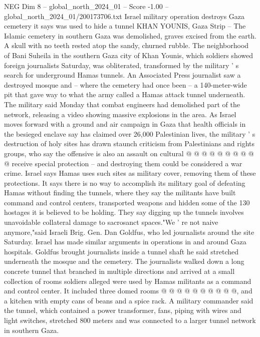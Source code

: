 \begin{textsample}{NEG Dim 8 – global\_north\_2024\_01 – Score -1.00 – global\_north\_2024\_01/200173706.txt}  \label{ex:f8_neg_210}
Israel military operation destroys Gaza cemetery it says was used to hide a tunnel KHAN YOUNIS, Gaza Strip -- The Islamic cemetery in southern Gaza was demolished, graves excised from the earth.
A skull with no teeth rested atop the sandy, churned rubble.
The neighborhood of Bani Suheila in the southern Gaza city of Khan Younis, which soldiers showed foreign journalists Saturday, was obliterated, transformed by the military ' s search for underground Hamas tunnels.
An Associated Press journalist saw a destroyed mosque and -- where the cemetery had once been -- a 140-meter-wide pit that gave way to what the army called a Hamas attack tunnel underneath.
The military said Monday that combat engineers had demolished part of the network, releasing a video showing massive explosions in the area.
As Israel moves forward with a ground and air campaign in Gaza that health officials in the besieged enclave say has claimed over 26,000 Palestinian lives, the military ' s destruction of holy sites has drawn staunch criticism from Palestinians and rights groups, who say the offensive is also an assault on cultural @ @ @ @ @ @ @ @ @ @ receive special protection -- and destroying them could be considered a war crime.
Israel says Hamas uses such sites as military cover, removing them of these protections.
It says there is no way to accomplish its military goal of defeating Hamas without finding the tunnels, where they say the militants have built command and control centers, transported weapons and hidden some of the 130 hostages it is believed to be holding.
They say digging up the tunnels involves unavoidable collateral damage to sacrosanct spaces."We ' re not naive anymore,"said Israeli Brig.
Gen.
Dan Goldfus, who led journalists around the site Saturday.
Israel has made similar arguments in operations in and around Gaza hospitals.
Goldfus brought journalists inside a tunnel shaft he said stretched underneath the mosque and the cemetery.
The journalists walked down a long concrete tunnel that branched in multiple directions and arrived at a small collection of rooms soldiers alleged were used by Hamas militants as a command and control center.
It included three domed rooms @ @ @ @ @ @ @ @ @ @, and a kitchen with empty cans of beans and a spice rack.
A military commander said the tunnel, which contained a power transformer, fans, piping with wires and light switches, stretched 800 meters and was connected to a larger tunnel network in southern Gaza.

\end{textsample}
